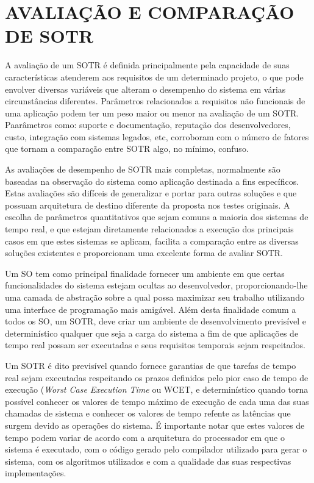 \chapter{AVALIAÇÃO E COMPARAÇÃO DE SOTR}
\label{cap:projeto}

A avaliação de um SOTR é definida principalmente pela capacidade de suas características atenderem aos requisitos de um determinado projeto, o que pode envolver diversas variáveis que alteram o desempenho do sistema em várias circunstâncias diferentes. Parâmetros relacionados a requisitos não funcionais de uma aplicação podem ter um peso maior ou menor na avaliação de um SOTR. Paarâmetros como: suporte e documentação, reputação dos desenvolvedores, custo, integração com sistemas legados, etc, corroboram com o número de fatores que tornam a comparação entre SOTR algo, no mínimo, confuso.

As avaliações de desempenho de SOTR  mais completas, normalmente são baseadas na observação do sistema como aplicação destinada a fins específicos. Estas avaliações são difíceis de generalizar e portar para outras soluções e que possuam arquitetura de destino diferente da proposta nos testes originais. A escolha de parâmetros quantitativos que sejam comuns a maioria dos sistemas de tempo real, e que estejam diretamente relacionados a execução dos principais casos em que estes sistemas se aplicam, facilita a comparação entre as diversas soluções existentes e proporcionam uma excelente forma de avaliar SOTR.

Um SO tem como principal finalidade fornecer um ambiente em que certas funcionalidades do sistema estejam ocultas ao desenvolvedor, proporcionando-lhe uma camada de abstração sobre a qual possa maximizar seu trabalho utilizando uma interface de programação mais amigável. Além desta finalidade comum a todos os SO, um SOTR, deve criar um ambiente de desenvolvimento previsível e determinístico qualquer que seja a carga do sistema a fim de que aplicações de tempo real possam ser executadas e seus requisitos temporais sejam respeitados. 

Um SOTR é dito previsível quando fornece garantias de que tarefas de tempo real sejam executadas respeitando os prazos definidos pelo pior caso de tempo de execução (\textit{Worst Case Execution Time} ou WCET, e determinístico quando torna possível conhecer os valores de tempo máximo de execução de cada uma das suas chamadas de sistema e conhecer os valores de tempo refente as latências que surgem devido as operações do sistema. É importante notar que estes valores de tempo podem variar de acordo com a arquitetura do processador em que o sistema é executado, com o código gerado pelo compilador utilizado para gerar o sistema, com os algoritmos utilizados e com a qualidade das suas respectivas implementações.

